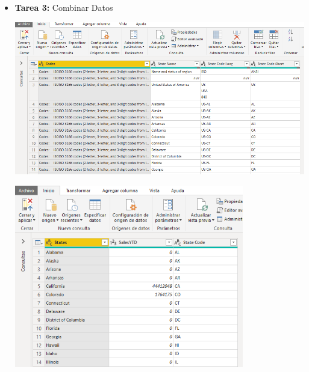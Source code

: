 \documentclass[12pt,letterpaper]{article}
\begin{document}
\begin{itemize}
	\item \textbf{Tarea 3:} Combinar Datos
	\begin{center}
	\includegraphics[width=15cm]{./Imagenes/2}
	\end{center}
	\begin{center}
	\includegraphics[width=10cm]{./Imagenes/3}
	\end{center}

\end{itemize}
\end{document}
